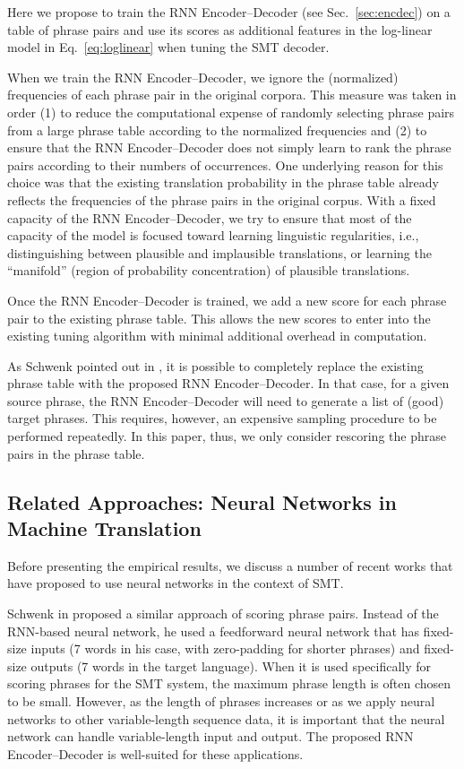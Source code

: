 Here we propose to train the RNN Encoder--Decoder (see
Sec.~\mbox{\ref{sec:encdec}}) on a table of phrase pairs and use its scores
as additional features in the log-linear model in Eq.~\eqref{eq:loglinear} when
tuning the SMT decoder.

When we train the RNN Encoder--Decoder, we ignore the (normalized) frequencies
of each phrase pair in the original corpora. This measure was taken in order (1)
to reduce the computational expense of randomly selecting phrase pairs from a
large phrase table according to the normalized frequencies and (2) to ensure
that the RNN Encoder--Decoder does not simply learn to rank the phrase pairs
according to their numbers of occurrences. One underlying reason for this choice
was that the existing translation probability in the phrase table already
reflects the frequencies of the phrase pairs in the original corpus. With a
fixed capacity of the RNN Encoder--Decoder, we try to ensure that most of
the capacity of the model is focused toward learning linguistic regularities,
i.e., distinguishing between plausible and implausible translations, or learning
the ``manifold'' (region of probability concentration) of plausible translations.

Once the RNN Encoder--Decoder is trained, we add a new score for each phrase
pair to the existing phrase table. This allows the new scores to enter
into the existing tuning algorithm with minimal additional overhead
in computation.

As Schwenk pointed out in \mbox{\cite{Schwenk2012}}, it is possible to
completely replace the existing phrase table with the proposed RNN
Encoder--Decoder. In that case, for a given source phrase, the RNN
Encoder--Decoder will need to generate a list of (good) target phrases. This
requires, however, an expensive sampling procedure to be performed repeatedly.
In this paper, thus, we only consider rescoring the phrase pairs in the phrase
table.


\subsection{Related Approaches: Neural Networks in Machine Translation}

Before presenting the empirical results, we discuss a number of recent works
that have proposed to use neural networks in the context of SMT.

Schwenk in \mbox{\cite{Schwenk2012}} proposed a similar approach of scoring
phrase pairs. Instead of the RNN-based neural network, he used a feedforward
neural network that has fixed-size inputs (7 words in his case, with
zero-padding for shorter phrases) and fixed-size outputs (7 words in the target
language). When it is used specifically for scoring phrases for the SMT system,
the maximum phrase length is often chosen to be small. However, as the length of
phrases increases or as we apply neural networks to other variable-length
sequence data, it is important that the neural network can handle
variable-length input and output. The proposed RNN Encoder--Decoder is
well-suited for these applications.

